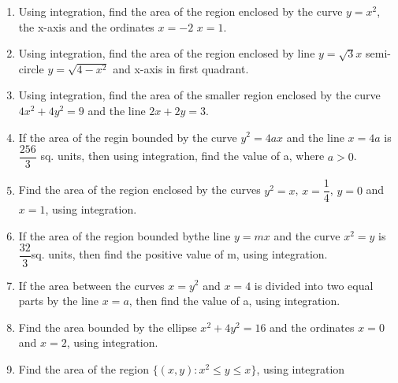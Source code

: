 \begin{enumerate}[label=\thesection.\arabic*.,ref=\thesection.\theenumi]
\item Using integration, find the area of the region enclosed by the curve $ y=x^2 $, the x-axis and the ordinates $x=-2$  $x=1$.

\item Using integration, find the area of the region enclosed by line $y=\sqrt{3}x$ semi-circle $y=\sqrt{4-x^2}$ and x-axis in first quadrant.

\item Using integration, find the area of the smaller region enclosed by the curve ${4x^2 + 4y^2} = 9$ and the line $2x + 2y =3$.

\item If the area of the regin bounded by the curve $y^2 = 4ax$ and the line $x = 4a$ is $\dfrac{256}{3}$\hspace{0.2cm} sq. units, then using integration, find the value of a, where $a>0$.

\item Find the area of the region enclosed by the curves $y^2=x$, $x=\dfrac{1}{4}$,  $y=0$ and $x=1$, using integration.

\item If the area of the region bounded bythe line $y=mx$ and the curve $x^2=y$ is $\dfrac{32}{3}$\hspace{0.2cm}sq. units, then find the positive value of m, using integration.

\item If the area between the curves $x = y^2$ and $x = 4$ is divided into two equal parts by the line $x = a$, then find the value of a, using integration.

\item Find the area bounded by the ellipse $x^2+4y^2=16$ and the ordinates $x=0$ and $x=2$, using integration.

\item Find the area of the region $\{(x,y) : x^2 \leq y \leq x\}$, using integration

\end{enumerate}

